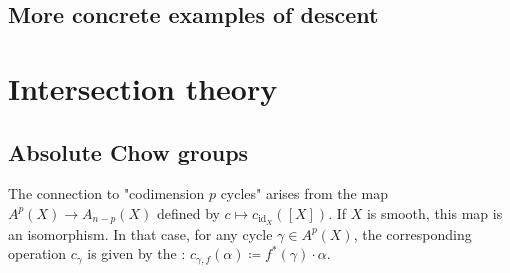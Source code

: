 \subsection{More concrete examples of descent}





\section{Intersection theory}

\subsection{Absolute Chow groups}









\begin{remark}
The connection to "codimension $p$ cycles" arises from the map $A^p(X) \to A_{n-p}(X)$ defined by $c \mapsto c_{\text{id}_X}([X])$. If $X$ is smooth, this map is an isomorphism. In that case, for any cycle $\gamma \in A^p(X)$, the corresponding operation $c_{\gamma}$ is given by the : $c_{\gamma, f}(\alpha) \coloneqq f^*(\gamma) \cdot \alpha$.
\end{remark}


